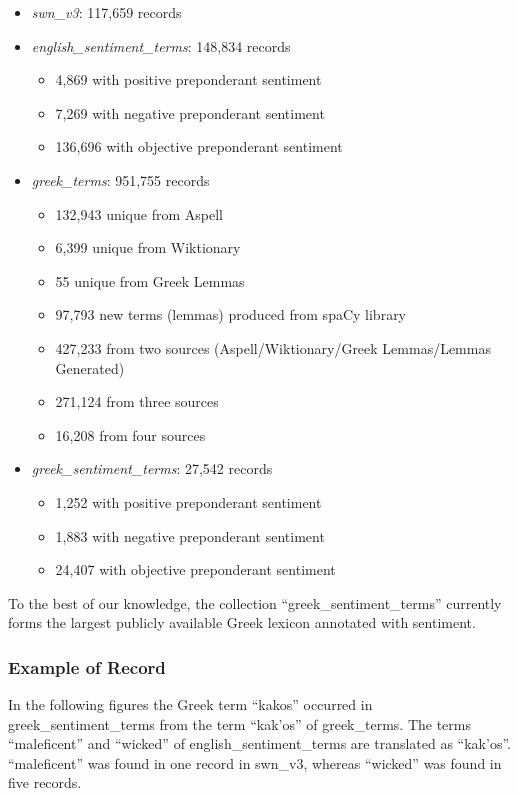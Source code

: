 \begin{itemize}
 \item \emph{swn\_v3}: 117,659 records
 \item \emph{english\_sentiment\_terms}: 148,834 records
 \begin{itemize}
  \item 4,869 with positive preponderant sentiment
  \item 7,269 with negative preponderant sentiment
  \item 136,696 with objective preponderant sentiment
 \end{itemize}
 \item \emph{greek\_terms}: 951,755 records
 \begin{itemize}
  \item 132,943 unique from Aspell
  \item 6,399 unique from Wiktionary
  \item 55 unique from Greek Lemmas
  \item 97,793 new terms (lemmas) produced from spaCy library
  \item 427,233 from two sources (Aspell/Wiktionary/Greek Lemmas/Lemmas Generated)
  \item 271,124 from three sources
  \item 16,208 from four sources
 \end{itemize}
 \item \emph{greek\_sentiment\_terms}: 27,542 records
 \begin{itemize}
  \item 1,252 with positive preponderant sentiment
  \item 1,883 with negative preponderant sentiment
  \item 24,407 with objective preponderant sentiment
 \end{itemize} 
\end{itemize}

To the best of our knowledge,
the collection ``greek\_sentiment\_terms'' currently forms
the largest publicly available Greek lexicon annotated with sentiment.

\subsubsection{Example of Record}
\label{subsubsec:recexample}

In the following figures
the Greek term ``\textgreek{kakos}'' occurred in greek\_sentiment\_terms
from the term ``\textgreek{kak'os}'' of greek\_terms.
The terms ``maleficent'' and ``wicked'' of english\_sentiment\_terms
are translated as ``\textgreek{kak'os}''.
``maleficent'' was found in one record in swn\_v3,
whereas ``wicked'' was found in five records. \\

